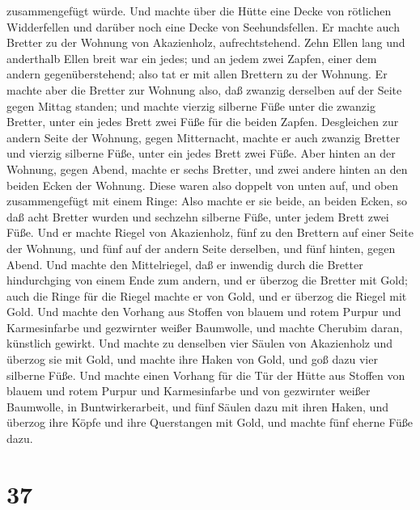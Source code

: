 zusammengefügt würde.  Und machte über die Hütte eine
Decke von rötlichen Widderfellen und darüber noch eine Decke von
Seehundsfellen.  Er machte auch Bretter zu der Wohnung
von Akazienholz, aufrechtstehend.  Zehn Ellen lang und
anderthalb Ellen breit war ein jedes;  und an jedem zwei
Zapfen, einer dem andern gegenüberstehend; also tat er mit allen
Brettern zu der Wohnung.  Er machte aber die Bretter zur
Wohnung also, daß zwanzig derselben auf der Seite gegen Mittag standen;
 und machte vierzig silberne Füße unter die zwanzig
Bretter, unter ein jedes Brett zwei Füße für die beiden Zapfen.
 Desgleichen zur andern Seite der Wohnung, gegen
Mitternacht, machte er auch zwanzig Bretter  und vierzig
silberne Füße, unter ein jedes Brett zwei Füße.  Aber
hinten an der Wohnung, gegen Abend, machte er sechs Bretter,
 und zwei andere hinten an den beiden Ecken der Wohnung.
 Diese waren also doppelt von unten auf, und oben
zusammengefügt mit einem Ringe: Also machte er sie beide, an beiden
Ecken,  so daß acht Bretter wurden und sechzehn silberne
Füße, unter jedem Brett zwei Füße.  Und er machte Riegel
von Akazienholz, fünf zu den Brettern auf einer Seite der Wohnung,
 und fünf auf der andern Seite derselben, und fünf
hinten, gegen Abend.  Und machte den Mittelriegel, daß er
inwendig durch die Bretter hindurchging von einem Ende zum andern,
 und er überzog die Bretter mit Gold; auch die Ringe für
die Riegel machte er von Gold, und er überzog die Riegel mit Gold.
 Und machte den Vorhang aus Stoffen von blauem und rotem
Purpur und Karmesinfarbe und gezwirnter weißer Baumwolle, und machte
Cherubim daran, künstlich gewirkt.  Und machte zu
denselben vier Säulen von Akazienholz und überzog sie mit Gold, und
machte ihre Haken von Gold, und goß dazu vier silberne Füße.
 Und machte einen Vorhang für die Tür der Hütte aus
Stoffen von blauem und rotem Purpur und Karmesinfarbe und von gezwirnter
weißer Baumwolle, in Buntwirkerarbeit,  und fünf Säulen
dazu mit ihren Haken, und überzog ihre Köpfe und ihre Querstangen mit
Gold, und machte fünf eherne Füße dazu.

\hypertarget{section-36}{%
\section{37}\label{section-36}}

